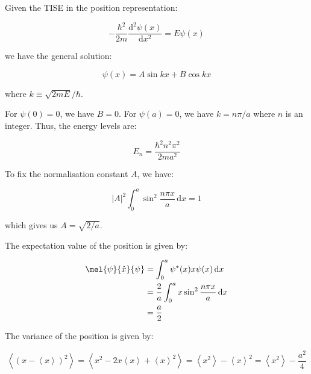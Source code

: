 \documentclass[12pt]{article}
\begin{document}
Given the TISE in the position representation:

\begin{equation}
    -\frac{\hbar^{2}}{2m} \frac{\mathrm{d}^{2} \psi(x)}{\mathrm{d}x^{2}} = E \psi(x)
\end{equation}

we have the general solution:

\begin{equation}
    \psi(x) = A \sin{kx} + B \cos{kx}
\end{equation}

where $k \equiv \sqrt{2mE}/\hbar$.

For $\psi(0) = 0$, we have $B = 0$. For $\psi(a) = 0$, we have $k = n\pi/a$ where $n$ is an integer. Thus, the energy levels are:

\begin{equation}
    E_{n} = \frac{\hbar^{2} n^{2} \pi^{2}}{2ma^{2}}
\end{equation}

To fix the normalisation constant $A$, we have:

\begin{equation}
    \left\lvert A \right\rvert^{2} \int_{0}^{a} \sin^{2} \frac{n\pi x}{a} \, \mathrm{d}x = 1
\end{equation}

which gives us $A = \sqrt{2/a}$.


The expectation value of the position is given by:

\begin{equation}
    \begin{split}
        \mel{\psi}{\hat{x}}{\psi} &= \int_{0}^{a} \psi^{*}(x) x \psi(x) \, \mathrm{d}x \\
        &= \frac{2}{a} \int_{0}^{a} x \sin^{2} \frac{n\pi x}{a} \, \mathrm{d}x \\
        &= \frac{a}{2}
    \end{split}
\end{equation}

The variance of the position is given by:

\begin{equation}
    \left\langle (x - \left\langle x \right\rangle)^{2} \right\rangle = \left\langle x^{2} - 2x \left\langle x \right\rangle + \left\langle x \right\rangle^{2} \right\rangle = \left\langle x^{2} \right\rangle - \left\langle x \right\rangle^{2} = \left\langle x^{2} \right\rangle - \frac{a^{2}}{4}
\end{equation}
\end{document}
